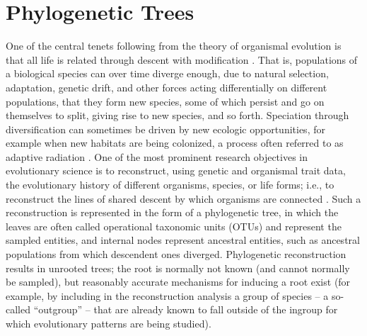 \section{Phylogenetic Trees}\label{sec:trees-of-life}

One of the central tenets following from the theory of organismal
evolution is that all life is related through descent with
modification \cite{Darwin1859-ka}. That is, populations of a
biological species can over time diverge enough, due to natural
selection, adaptation, genetic drift, and other forces acting
differentially on different populations, that they form new species,
some of which persist and go on themselves to split, giving rise to
new species, and so forth. Speciation through diversification can
sometimes be driven by new ecologic opportunities, for example when
new habitats are being colonized, a process often referred to as
adaptive radiation \cite{Simpson1949-pv,Simpson1953-qg}. One of the
most prominent research objectives in evolutionary science is to
reconstruct, using genetic and organismal trait data, the evolutionary
history of different organisms, species, or life forms; i.e., to
reconstruct the lines of shared descent by which organisms are
connected \cite{Felsenstein2003-ji,Swofford1996-ya}. Such a
reconstruction is represented in the form of a phylogenetic tree, in
which the leaves are often called operational taxonomic units (OTUs)
and represent the sampled entities, and internal nodes represent
ancestral entities, such as ancestral populations from which
descendent ones diverged. Phylogenetic reconstruction results in
unrooted trees; the root is normally not known (and cannot normally be
sampled), but reasonably accurate mechanisms for inducing a root exist
\cite{Huelsenbeck2002-hm,Maddison1984-qa} (for example, by including
in the reconstruction analysis a group of species -- a so-called
``outgroup'' -- that are already known to fall outside of the ingroup
for which evolutionary patterns are being studied).

